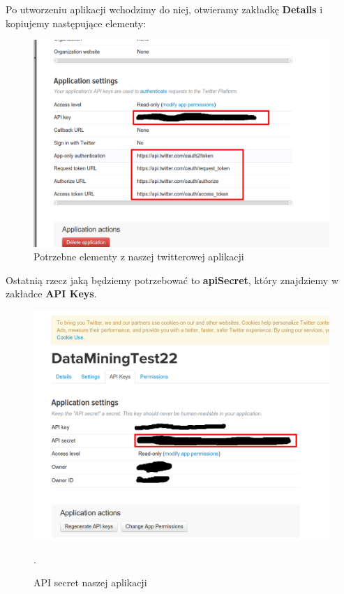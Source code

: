 \documentclass[12pt,a4paper]{article}
\begin{document}
Po utworzeniu aplikacji wchodzimy do niej, otwieramy zakładkę \textbf{Details} i kopiujemy następujące elementy: 
\begin{figure}[H]
\begin{center}
\includegraphics[scale=0.2]{pictures/Twitter3.png}
\caption{Potrzebne elementy z naszej twitterowej aplikacji}
\end{center}
\end{figure}
Ostatnią rzecz jaką będziemy potrzebować to \textbf{apiSecret}, który znajdziemy w zakładce \textbf{API Keys}.
\begin{figure}[H]
\begin{center}
\includegraphics[scale=0.2]{pictures/Twitter4.png}
\caption{API secret naszej aplikacji}.
\end{center}
\end{figure}
\end{document}
